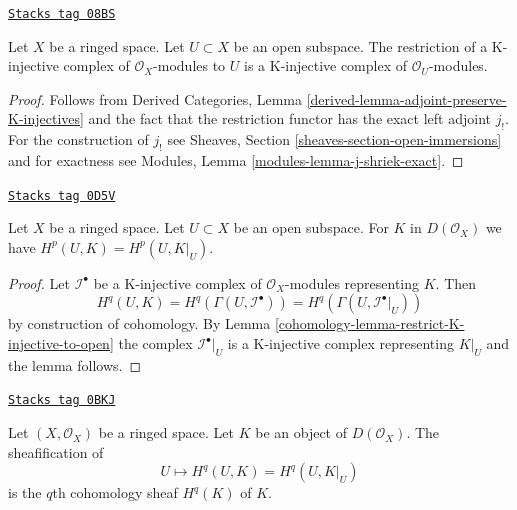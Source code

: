 \begin{lemma}
\label{cohomology-lemma-restrict-K-injective-to-open}
\href{https://stacks.math.columbia.edu/tag/08BS}{\texttt{Stacks tag 08BS}}

Let $X$ be a ringed space. Let $U \subset X$ be an open subspace.
The restriction of a K-injective complex of $\mathcal{O}_X$-modules
to $U$ is a K-injective complex of $\mathcal{O}_U$-modules.
\end{lemma}

\begin{proof}
Follows from
Derived Categories, Lemma \ref{derived-lemma-adjoint-preserve-K-injectives}
and the fact that the restriction functor has the
exact left adjoint $j_!$.
For the construction of $j_!$ see
Sheaves, Section \ref{sheaves-section-open-immersions}
and for exactness see Modules, Lemma \ref{modules-lemma-j-shriek-exact}.
\end{proof}

\begin{lemma}
\label{cohomology-lemma-unbounded-cohomology-of-open}
\href{https://stacks.math.columbia.edu/tag/0D5V}{\texttt{Stacks tag 0D5V}}

Let $X$ be a ringed space. Let $U \subset X$ be an open subspace.
For $K$ in $D(\mathcal{O}_X)$ we have
$H^p(U, K) = H^p(U, K|_U)$.
\end{lemma}

\begin{proof}

Let $\mathcal{I}^\bullet$ be a K-injective complex of $\mathcal{O}_X$-modules
representing $K$. Then
$$
H^q(U, K) = H^q(\Gamma(U, \mathcal{I}^\bullet)) =
H^q(\Gamma(U, \mathcal{I}^\bullet|_U))
$$
by construction of cohomology. By Lemma \ref{cohomology-lemma-restrict-K-injective-to-open}
the complex $\mathcal{I}^\bullet|_U$ is a K-injective complex
representing $K|_U$ and the lemma follows.
\end{proof}

\begin{lemma}
\label{cohomology-lemma-sheafification-cohomology}
\href{https://stacks.math.columbia.edu/tag/0BKJ}{\texttt{Stacks tag 0BKJ}}

Let $(X, \mathcal{O}_X)$ be a ringed space. Let $K$ be an object of
$D(\mathcal{O}_X)$. The sheafification of
$$
U \mapsto H^q(U, K) = H^q(U, K|_U)
$$
is the $q$th cohomology sheaf $H^q(K)$ of $K$.
\end{lemma}

